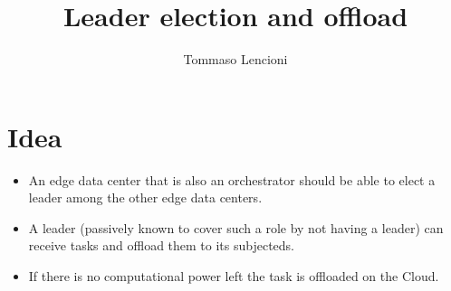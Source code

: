 \documentclass[12pt, a4paper]{report} %
\title{Leader election and offload}
\author{Tommaso Lencioni}
\begin{document}
\section*{Idea}
\begin{itemize}
	\item An edge data center that is also an orchestrator should be able to elect a leader among the other edge data centers.
	\item A leader (passively known to cover such a role by not having a leader) can receive tasks and offload them to its subjecteds.
	\item If there is no computational power left the task is offloaded on the Cloud.
\end{itemize}
\end{document}
